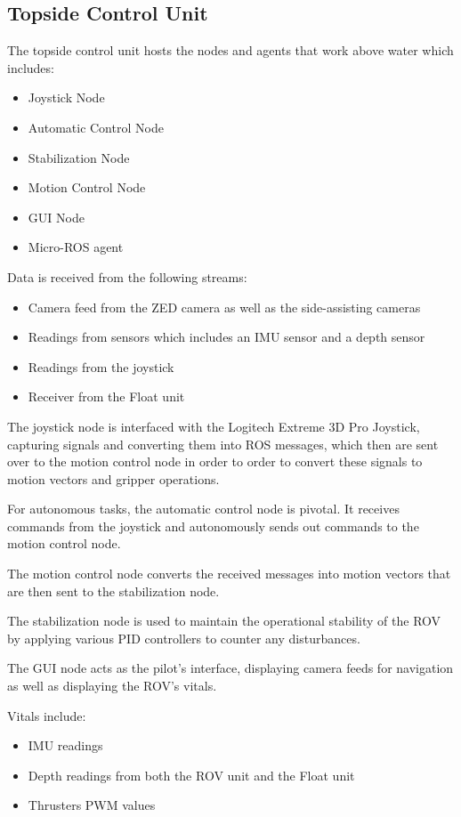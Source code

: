 \subsection{Topside Control Unit}
The topside control unit hosts the nodes and agents that work above water which includes:
\begin{itemize}
    \item Joystick Node
    \item Automatic Control Node
    \item Stabilization Node
    \item Motion Control Node 
    \item GUI Node
    \item Micro-ROS agent
\end{itemize}
Data is received from the following streams:
\begin{itemize}
    \item Camera feed from the ZED camera as well as the side-assisting cameras
    \item Readings from sensors which includes an IMU sensor and a depth sensor
    \item Readings from the joystick
    \item Receiver from the Float unit
\end{itemize}
The joystick node is interfaced with the Logitech Extreme 3D Pro Joystick, capturing signals and converting them into ROS messages, which then are sent over to the motion control node in order to order to convert these signals to motion vectors and gripper operations. 

For autonomous tasks, the automatic control node is pivotal. It receives commands from the joystick and autonomously sends out commands to the motion control node.

The motion control node converts the received messages into motion vectors that are then sent to the stabilization node.

The stabilization node is used to maintain the operational stability of the ROV by applying various PID controllers to counter any disturbances.

The GUI node acts as the pilot's interface, displaying camera feeds for navigation as well as displaying the ROV's vitals.

Vitals include: 
\begin{itemize}
    \item IMU readings
    \item Depth readings from both the ROV unit and the Float unit
    \item Thrusters PWM values
\end{itemize}

